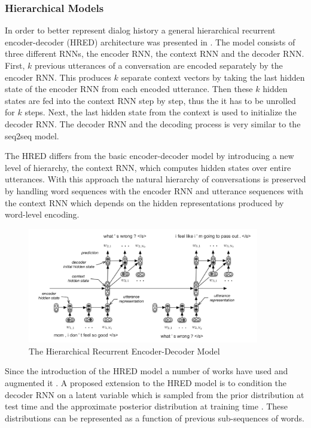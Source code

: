 \documentclass[12pt]{article}
\begin{document}
\subsubsection{Hierarchical Models} \label{sssec:HRED}
In order to better represent dialog history a general hierarchical recurrent encoder-decoder (HRED) architecture was presented in \cite{Serban:2015}. The model consists of three different RNNs, the encoder RNN, the context RNN and the decoder RNN. First, \(k\) previous utterances of a conversation are encoded separately by the encoder RNN. This produces \(k\) separate context vectors by taking the last hidden state of the encoder RNN from each encoded utterance. Then these \(k\) hidden states are fed into the context RNN step by step, thus the it has to be unrolled for \(k\) steps. Next, the last hidden state from the context is used to initialize the decoder RNN. The decoder RNN and the decoding process is very similar to the seq2seq model.

The HRED differs from the basic encoder-decoder model by introducing a new level of hierarchy, the context RNN, which computes hidden states over entire utterances. With this approach the natural hierarchy of conversations is preserved by handling word sequences with the encoder RNN and utterance sequences with the context RNN which depends on the hidden representations produced by word-level encoding.

\begin{figure}[H]
	\label{fig:HRED}
	\centering
	\includegraphics[width=0.9\textwidth]{pics/HRED.png}
	\caption{The Hierarchical Recurrent Encoder-Decoder Model \cite{Serban:2015}}
\end{figure}
Since the introduction of the HRED model a number of works have used and augmented it \cite{Serban_VHRED:2017,Serban_MrRNN:2017,Serban:2017,Shen:2017,Li_adversarial:2017}. A proposed extension to the HRED model is to condition the decoder RNN on a latent variable which is sampled from the prior distribution at test time and the approximate posterior distribution at training time \cite{Serban_VHRED:2017}. These distributions can be represented as a function of previous sub-sequences of words. 
\end{document}
